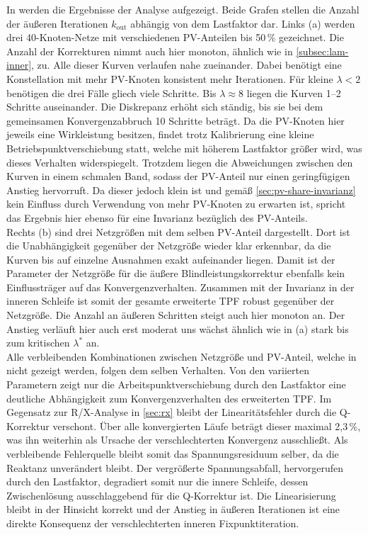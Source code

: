 In  werden die Ergebnisse der Analyse aufgezeigt. 
Beide Grafen stellen die Anzahl der äußeren Iterationen $k_\mathrm{out}$ abhängig von dem Lastfaktor dar.
Links (a) werden drei 40-Knoten-Netze mit verschiedenen PV-Anteilen bis 50\,\%  gezeichnet.
Die Anzahl der Korrekturen nimmt auch hier monoton, ähnlich wie in \cref{subsec:lam-inner}, zu.
Alle dieser Kurven verlaufen nahe zueinander.
Dabei benötigt eine Konstellation mit mehr PV-Knoten konsistent mehr Iterationen.
Für kleine $\lambda<2$ benötigen die drei Fälle gliech viele Schritte.
Bis $\lambda\approx8$ liegen die Kurven 1--2 Schritte auseinander. 
Die Diskrepanz erhöht sich ständig, bis sie bei dem gemeinsamen Konvergenzabbruch 10 Schritte beträgt.
Da die PV-Knoten hier jeweils eine Wirkleistung besitzen, findet trotz Kalibrierung eine kleine Betriebspunktverschiebung statt, welche mit höherem Lastfaktor größer wird, was dieses Verhalten widerspiegelt.
Trotzdem liegen die Abweichungen zwischen den Kurven in einem schmalen Band, sodass der PV-Anteil nur einen geringfügigen Anstieg hervorruft.
Da dieser jedoch klein ist und gemäß \cref{sec:pv-share-invarianz} kein Einfluss durch Verwendung von mehr PV-Knoten zu erwarten ist, spricht das Ergebnis hier ebenso für eine Invarianz bezüglich des PV-Anteils. 
\\




Rechts (b) sind drei Netzgrößen mit dem selben PV-Anteil dargestellt.
Dort ist die Unabhängigkeit gegenüber der Netzgröße wieder klar erkennbar, da die Kurven bis auf einzelne Ausnahmen exakt aufeinander liegen.
Damit ist der Parameter der Netzgröße für die äußere Blindleistungskorrektur ebenfalls kein Einflussträger auf das Konvergenzverhalten.
Zusammen mit der Invarianz in der inneren Schleife ist somit der gesamte erweiterte TPF robust gegenüber der Netzgröße.
Die Anzahl an äußeren Schritten steigt auch hier monoton an.
Der Anstieg verläuft hier auch erst moderat uns wächst ähnlich wie in (a) stark bis zum kritischen $\lambda^*$ an.
\\


Alle verbleibenden Kombinationen zwischen Netzgröße und PV-Anteil, welche in  nicht gezeigt werden, folgen dem selben Verhalten.
Von den variierten Parametern zeigt nur die Arbeitspunktverschiebung durch den Lastfaktor eine deutliche Abhängigkeit zum Konvergenzverhalten des erweiterten TPF.
Im Gegensatz zur R/X-Analyse in \cref{sec:rx} bleibt der Linearitätsfehler durch die Q-Korrektur verschont.
Über alle konvergierten Läufe beträgt dieser maximal 2,3\,\%, was ihn weiterhin als Ursache der verschlechterten Konvergenz ausschließt.
Als verbleibende Fehlerquelle bleibt somit das Spannungsresiduum selber, da die Reaktanz unverändert bleibt.
Der vergrößerte Spannungsabfall, hervorgerufen durch den Lastfaktor, degradiert somit nur die innere Schleife, dessen Zwischenlösung ausschlaggebend für die Q-Korrektur ist. 
Die Linearisierung bleibt in der Hinsicht korrekt und der Anstieg in äußeren Iterationen ist eine direkte Konsequenz der verschlechterten inneren Fixpunktiteration.
\\ 

